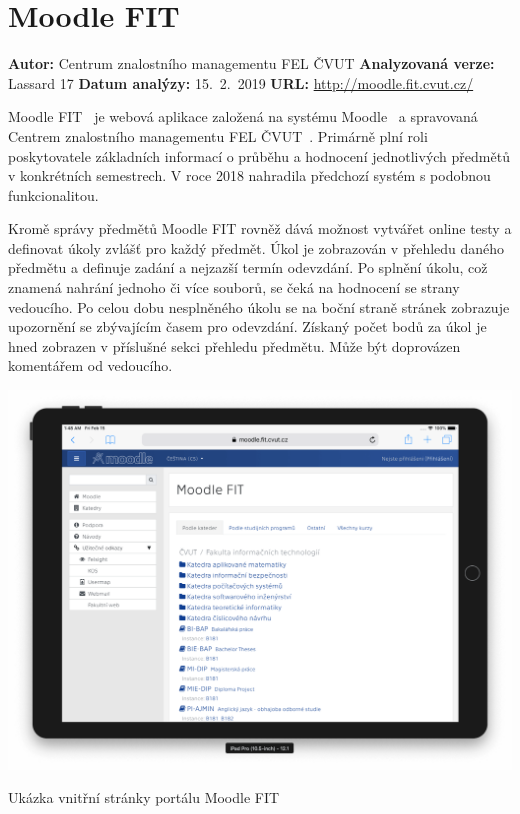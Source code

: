 

\section{Moodle FIT}

\textbf{Autor:} Centrum znalostního managementu FEL ČVUT\newline
\textbf{Analyzovaná verze:} Lassard 17\newline
\textbf{Datum analýzy:} 15.~2.~2019\newline
\textbf{URL:} \url{http://moodle.fit.cvut.cz/}

Moodle FIT~\cite{moodleFit} je webová aplikace založená na systému Moodle~\cite{moodle} a spravovaná Centrem znalostního managementu FEL ČVUT~\cite{czm}. Primárně plní roli poskytovatele základních informací o průběhu a hodnocení jednotlivých předmětů v konkrétních semestrech. V roce 2018 nahradila předchozí systém s podobnou funkcionalitou.

Kromě správy předmětů Moodle FIT rovněž dává možnost vytvářet online testy a definovat úkoly zvlášť pro každý předmět. Úkol je zobrazován v přehledu daného předmětu a definuje zadání a nejzazší termín odevzdání. Po splnění úkolu, což znamená nahrání jednoho či více souborů, se čeká na hodnocení se strany vedoucího. Po celou dobu nesplněného úkolu se na boční straně stránek zobrazuje upozornění se zbývajícím časem pro odevzdání. Získaný počet bodů za úkol je hned zobrazen v příslušné sekci přehledu předmětu. Může být doprovázen komentářem od vedoucího.


\begin{fig:illustration}
   \includegraphics[width=1\textwidth]{images/analyza-moodle.png}
   \caption{Ukázka vnitřní stránky portálu Moodle FIT}\label{pic:analyza-moodle}
\end{fig:illustration}


